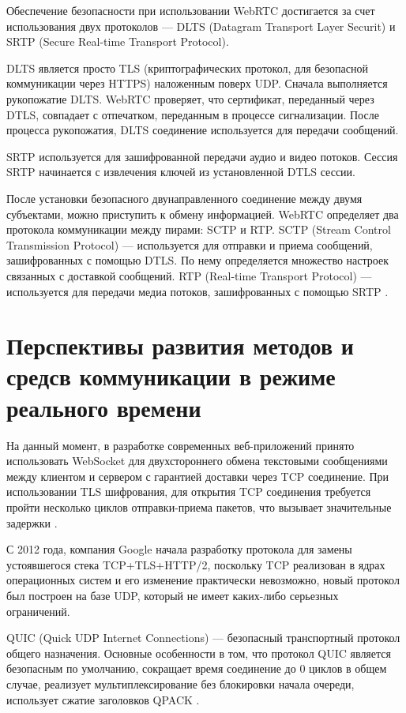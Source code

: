 Обеспечение безопасности при использовании WebRTC достигается за счет использования двух протоколов — DLTS (Datagram Transport Layer Securit) и SRTP (Secure Real-time Transport Protocol).

DLTS является просто TLS (криптографических протокол, для безопасной коммуникации через HTTPS) наложенным поверх UDP. Сначала выполняется рукопожатие DLTS. WebRTC проверяет, что сертификат, переданный через DTLS, совпадает с отпечатком, переданным в процессе сигнализации. После процесса рукопожатия, DLTS соединение используется для передачи сообщений.

SRTP используется для зашифрованной передачи аудио и видео потоков. Сессия SRTP начинается с извлечения ключей из установленной DTLS сессии.

После установки безопасного двунаправленного соединение между двумя субъектами, можно приступить к обмену информацией. WebRTC определяет два протокола коммуникации между пирами: SCTP и RTP. SCTP (Stream Control Transmission Protocol) — используется для отправки и приема сообщений, зашифрованных с помощью DTLS. По нему определяется множество настроек связанных с доставкой сообщений. RTP (Real-time Transport Protocol) — используется для передачи медиа потоков, зашифрованных с помощью SRTP \cite{WebRTCSCTP}.

\section{Перспективы развития методов и средсв коммуникации в режиме реального времени}

На данный момент, в разработке современных веб-приложений принято использовать WebSocket для двухстороннего обмена текстовыми сообщениями между клиентом и сервером с гарантией доставки через TCP соединение. При использовании TLS шифрования, для открытия TCP соединения требуется пройти несколько циклов отправки-приема пакетов, что вызывает значительные задержки \cite{WebRTCCongestion}.

С 2012 года, компания Google начала разработку протокола для замены устоявшегося стека TCP+TLS+HTTP/2, поскольку TCP реализован в ядрах операционных систем и его изменение практически невозможно, новый протокол был построен на базе UDP, который не имеет каких-либо серьезных ограничений.

QUIC (Quick UDP Internet Connections) — безопасный транспортный протокол общего назначения. Основные особенности в том, что протокол QUIC является безопасным по умолчанию, сокращает время соединение до 0 циклов в общем случае, реализует мультиплексирование без блокировки начала очереди, использует сжатие заголовков QPACK \cite{rfc9000}.

